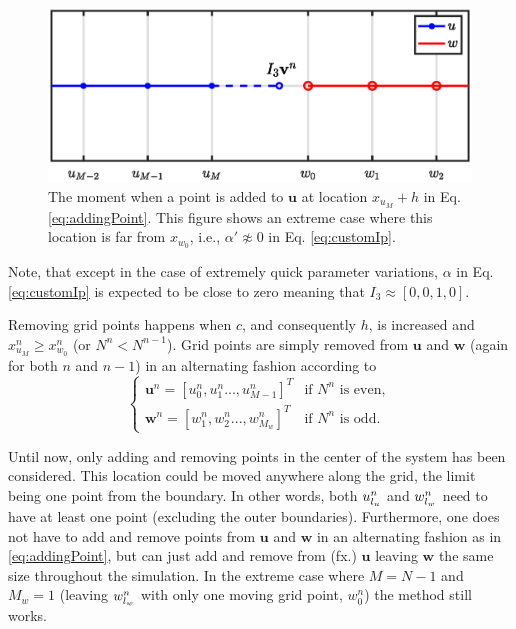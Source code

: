 \begin{figure}[ht]
    \centering
\includegraphics[width=\figwidth\columnwidth]{Figures/addingGridPoint4.eps}
\caption{\label{fig:addingPoint}{The moment when a point is added to $\mathbf{u}$ at location $x_{u_M} + h$ in Eq. \eqref{eq:addingPoint}. This figure shows an extreme case where this location is far from $x_{w_0}$, i.e., $\alpha' \not\approx 0$ in Eq. \eqref{eq:customIp}.}}
\end{figure}
%
Note, that except in the case of extremely quick parameter variations, $\alpha$ in Eq. \eqref{eq:customIp} is expected to be close to zero%
meaning that $I_3 \approx [0, 0, 1, 0]$. %

Removing grid points happens when $c$, and consequently $h$, is increased and $x_{u_M}^n \geq x_{w_0}^n$ (or $ N^n <  N^{n-1}$). %
Grid points are simply removed from $\mathbf{u}$ and $\mathbf{w}$ (again for both $n$ and $n-1$) in an alternating fashion according to
\begin{equation}\label{eq:removingPoint}
\begin{cases}
    \mathbf{u}^n = [u_0^n, u_1^n ..., u_{M-1}^n]^T & \text{if $N^n$ is even}, \\
     \mathbf{w}^n = [w_1^n, w_2^n ..., w_{M_w}^n]^T & \text{if $N^n$ is odd}.
    \end{cases}
\end{equation}

Until now, only adding and removing points in the center of the system has been considered. This location could be moved anywhere along the grid, the limit being one point from the boundary. In other words, both $u_{l_u}^n$ and $w_{l_w}^n$ need to have at least one point (excluding the outer boundaries). Furthermore, one does not have to add and remove points from $\mathbf{u}$ and $\mathbf{w}$ in an alternating fashion as in \eqref{eq:addingPoint}, but can just add and remove from (fx.) $\mathbf{u}$ leaving $\mathbf{w}$ the same size throughout the simulation. In the extreme case where $M = N - 1$ and $M_w = 1$ (leaving $w_{l_w}^n$ with only one moving grid point, $w_0^n$) the method still works.

